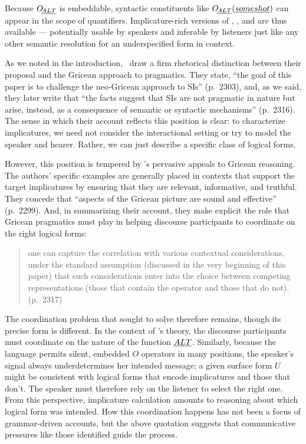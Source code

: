 \documentclass[leqno]{article}
\begin{document}
Because $\mathop{O\negthinspace_{\emph{ALT}}}$ is embeddable, syntactic constituents like
$\mathop{O\negthinspace_{\emph{ALT}}}(\emph{some shot})$ can appear in the scope of quantifiers.
Implicature-rich versions of , , and
 are thus available --- potentially usable by
speakers and inferable by listeners just like any other semantic
resolution for an underspecified form in context.

As we noted in the introduction, \CFS\ draw a firm rhetorical
distinction between their proposal and the Gricean approach to
pragmatics. They state, ``the goal of this paper is to challenge the
neo-Gricean approach to SIs'' (p.~2303), and, as we said, they later
write that ``the facts suggest that SIs are not pragmatic in nature
but arise, instead, as a consequence of semantic or syntactic
mechanisms'' (p.~2316). The sense in which their account reflects this
position is clear: to characterize implicatures, we need not consider
the interactional setting or try to model the speaker and
hearer. Rather, we can just describe a specific class of logical
forms.

However, this position is tempered by \CFS's pervasive appeals to
Gricean reasoning.  The authors' specific examples are generally
placed in contexts that support the target implicatures by ensuring
that they are relevant, informative, and truthful.  They concede that
``aspects of the Gricean picture are sound and effective''
(p.~2299). And, in summarizing their account, they make explicit the
role that Gricean pragmatics must play in helping discourse
participants to coordinate on the right logical forms:
%
\begin{quote}
  one can capture the correlation with various contextual
  considerations, under the standard assumption (discussed in the very
  beginning of this paper) that such considerations enter into the
  choice between competing representations (those that contain the
  operator and those that do not). (p.~2317)
\end{quote}

The coordination problem that \citeauthor{Grice75} sought to solve
therefore remains, though its precise form is different. In the
context of \CFS's theory, the discourse participants must coordinate on
the nature of the function $\emph{ALT}$.  Similarly, because the language
permits silent, embedded $O$ operators in many positions, the
speaker's signal always underdetermines her intended message; a given
surface form $U$ might be consistent with logical forms that encode
implicatures and those that don't. The speaker must therefore rely on
the listener to select the right one.  From this perspective,
implicature calculation amounts to reasoning about which logical form
was intended. How this coordination happens has not been a focus of
grammar-driven accounts, but the above quotation suggests that
communicative pressures like those \citeauthor{Grice75} identified
guide the process.
\end{document}
